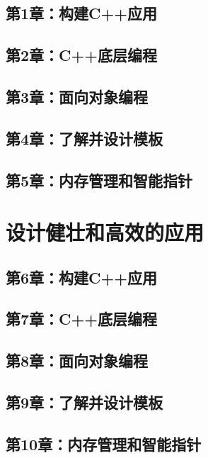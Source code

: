 \documentclass[11pt,a4paper,UTF8]{ctexart}
\begin{document}
		\subsection{第1章：构建C++应用}
			
		\subsection{第2章：C++底层编程}
			
		\subsection{第3章：面向对象编程}
			
		\subsection{第4章：了解并设计模板}
			
		\subsection{第5章：内存管理和智能指针}
			
	\section{设计健壮和高效的应用}
		
		\subsection{第6章：构建C++应用}
			
		\subsection{第7章：C++底层编程}
			
		\subsection{第8章：面向对象编程}
			
		\subsection{第9章：了解并设计模板}
			
		\subsection{第10章：内存管理和智能指针}
			
\end{document}
